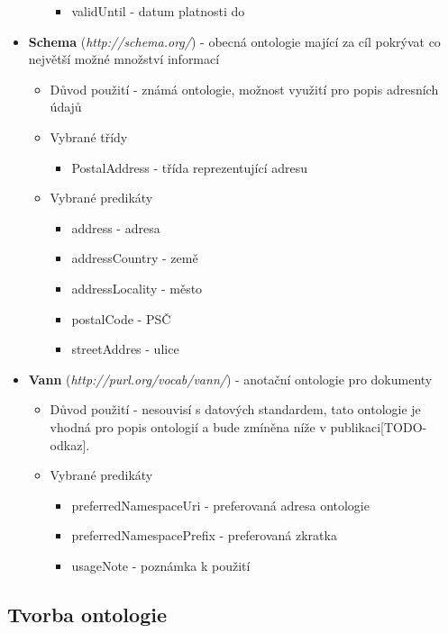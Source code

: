 \begin{itemize}
\begin{itemize}
\begin{itemize}
		\item validUntil - datum platnosti do
		\end{itemize}
	\end{itemize}
\item \textbf{Schema} (\textit{http://schema.org/}) - obecná ontologie mající za cíl pokrývat co největší možné množství informací
	\begin{itemize}
	\item Důvod použití - známá ontologie, možnost využití pro popis adresních údajů 
	\item Vybrané třídy 
		\begin{itemize}
		\item PostalAddress - třída reprezentující adresu 
		\end{itemize}
	\item Vybrané predikáty
		\begin{itemize}
		\item address - adresa
		\item addressCountry - země
		\item addressLocality - město
		\item postalCode - PSČ
		\item streetAddres - ulice
		\end{itemize}
	\end{itemize}
\item \textbf{Vann} (\textit{http://purl.org/vocab/vann/}) - anotační ontologie pro dokumenty 
	\begin{itemize}
	\item Důvod použití - nesouvisí s datových standardem, tato ontologie je vhodná pro popis ontologií a bude zmíněna níže v publikaci[TODO-odkaz].
	\item Vybrané predikáty
		\begin{itemize}
		\item preferredNamespaceUri - preferovaná adresa ontologie
		\item preferredNamespacePrefix - preferovaná zkratka
		\item usageNote - poznámka k použití
		\end{itemize}
	\end{itemize}

\end{itemize}

\subsection{Tvorba ontologie}

